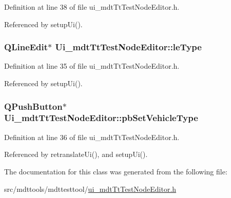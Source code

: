 Definition at line 38 of file ui\-\_\-mdt\-Tt\-Test\-Node\-Editor.\-h.



Referenced by setup\-Ui().

\hypertarget{class_ui__mdt_tt_test_node_editor_a3b75c24851c96a8dd38b4782a532937b}{
\subsubsection[{le\-Type}]{\setlength{\rightskip}{0pt plus 5cm}Q\-Line\-Edit$\ast$ Ui\-\_\-mdt\-Tt\-Test\-Node\-Editor\-::le\-Type}}\label{class_ui__mdt_tt_test_node_editor_a3b75c24851c96a8dd38b4782a532937b}


Definition at line 35 of file ui\-\_\-mdt\-Tt\-Test\-Node\-Editor.\-h.



Referenced by setup\-Ui().

\hypertarget{class_ui__mdt_tt_test_node_editor_a8affa39aad17128e9c1cab6309cb52fc}{
\subsubsection[{pb\-Set\-Vehicle\-Type}]{\setlength{\rightskip}{0pt plus 5cm}Q\-Push\-Button$\ast$ Ui\-\_\-mdt\-Tt\-Test\-Node\-Editor\-::pb\-Set\-Vehicle\-Type}}\label{class_ui__mdt_tt_test_node_editor_a8affa39aad17128e9c1cab6309cb52fc}


Definition at line 36 of file ui\-\_\-mdt\-Tt\-Test\-Node\-Editor.\-h.



Referenced by retranslate\-Ui(), and setup\-Ui().



The documentation for this class was generated from the following file\-:\begin{DoxyCompactItemize}
\item 
src/mdttools/mdttesttool/\hyperlink{ui__mdt_tt_test_node_editor_8h}{ui\-\_\-mdt\-Tt\-Test\-Node\-Editor.\-h}\end{DoxyCompactItemize}
